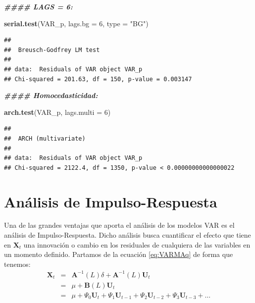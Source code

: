 \documentclass[
]{book}
\newenvironment{Shaded}{\begin{snugshade}}{\end{snugshade}}
\newcommand{\AttributeTok}[1]{\textcolor[rgb]{0.13,0.29,0.53}{#1}}
\newcommand{\DecValTok}[1]{\textcolor[rgb]{0.00,0.00,0.81}{#1}}
\newcommand{\DocumentationTok}[1]{\textcolor[rgb]{0.56,0.35,0.01}{\textbf{\textit{#1}}}}
\newcommand{\FunctionTok}[1]{\textcolor[rgb]{0.13,0.29,0.53}{\textbf{#1}}}
\newcommand{\NormalTok}[1]{#1}
\newcommand{\StringTok}[1]{\textcolor[rgb]{0.31,0.60,0.02}{#1}}
\begin{document}
\begin{Shaded}
\begin{Highlighting}[]
\DocumentationTok{\#\#\#\# LAGS = 6:}

\FunctionTok{serial.test}\NormalTok{(VAR\_p, }\AttributeTok{lags.bg =} \DecValTok{6}\NormalTok{, }\AttributeTok{type =} \StringTok{"BG"}\NormalTok{)}
\end{Highlighting}
\end{Shaded}

\begin{verbatim}
## 
##  Breusch-Godfrey LM test
## 
## data:  Residuals of VAR object VAR_p
## Chi-squared = 201.63, df = 150, p-value = 0.003147
\end{verbatim}

\begin{Shaded}
\begin{Highlighting}[]
\DocumentationTok{\#\#\#\# Homocedasticidad:}

\FunctionTok{arch.test}\NormalTok{(VAR\_p, }\AttributeTok{lags.multi =} \DecValTok{6}\NormalTok{)}
\end{Highlighting}
\end{Shaded}

\begin{verbatim}
## 
##  ARCH (multivariate)
## 
## data:  Residuals of VAR object VAR_p
## Chi-squared = 2122.4, df = 1350, p-value < 0.00000000000000022
\end{verbatim}

\hypertarget{anuxe1lisis-de-impulso-respuesta}{%
\section{Análisis de Impulso-Respuesta}\label{anuxe1lisis-de-impulso-respuesta}}

Una de las grandes ventajas que aporta el análisis de los modelos VAR es el análisis de Impulso-Respuesta. Dicho análisis busca cuantificar el efecto que tiene en \(\mathbf{X}_t\) una innovación o cambio en los residuales de cualquiera de las variables en un momento definido. Partamos de la ecuación \eqref{eq:VARMAq} de forma que tenemos:
\begin{eqnarray}
    \mathbf{X}_t & = & \mathbf{A}^{-1}(L) \delta + \mathbf{A}^{-1}(L) \mathbf{U}_t \nonumber \\
    & = & \mu + \mathbf{B}(L) \mathbf{U}_t \nonumber \\
    & = & \mu + \Psi_0 \mathbf{U}_t + \Psi_1 \mathbf{U}_{t-1} + \Psi_2 \mathbf{U}_{t-2} + \Psi_3 \mathbf{U}_{t-3} + \ldots
\end{eqnarray}
\end{document}
